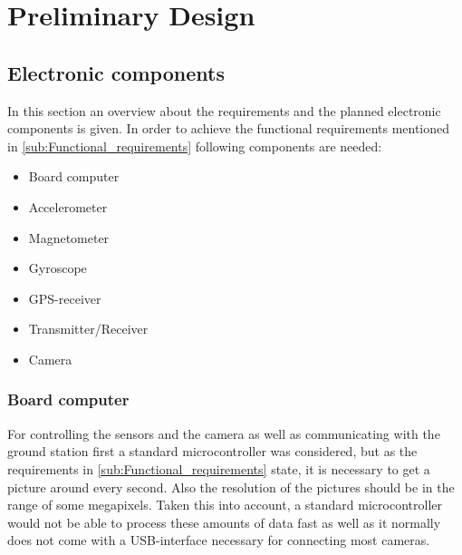 \documentclass[fontsize=11pt,paper=a4,]{scrartcl}
\begin{document}
\section{Preliminary Design}

\subsection{Electronic components}
In this section an overview about the requirements and the planned electronic components is given. In order to achieve the functional requirements mentioned in \ref{sub:Functional_requirements} following components are needed:

\begin{itemize}
 \item Board computer
 \item Accelerometer
 \item Magnetometer
 \item Gyroscope
 \item GPS-receiver
 \item Transmitter/Receiver
 \item Camera
\end{itemize}

\FloatBarrier
\subsubsection*{Board computer}

For controlling the sensors and the camera as well as communicating with the ground station first a standard microcontroller was considered, but as the requirements in \ref{sub:Functional_requirements} state, it is necessary to get a picture around every second. Also the resolution of the pictures should be in the range of some megapixels. Taken this into account, a standard microcontroller would not be able to process these amounts of data fast as well as it normally does not come with a USB-interface necessary for connecting most cameras.
\end{document}
